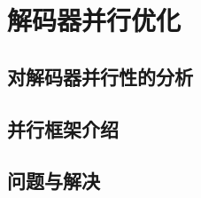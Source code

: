 

\chapter{解码器并行优化}
\label{cha:parallelopt}

\section{对解码器并行性的分析}
\label{sec:parallelpossibility}

\section{并行框架介绍}
\label{sec:parallelstructurebrief}

\section{问题与解决}
\label{sec:parallelbuganddebug}